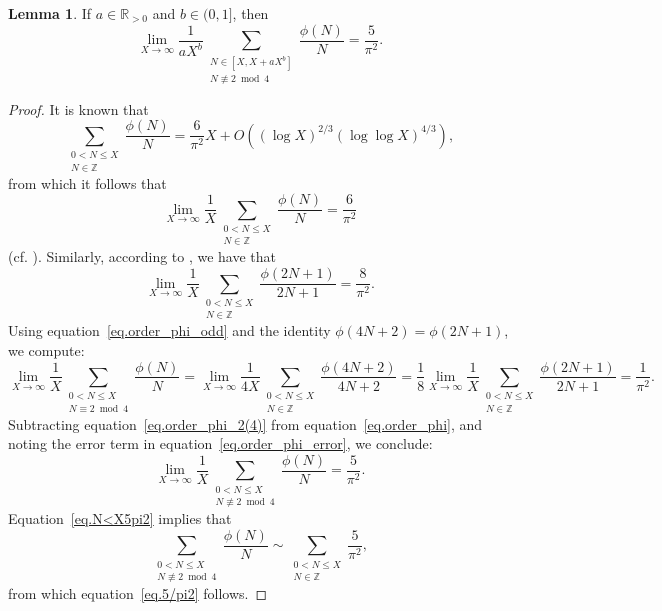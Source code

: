 \documentclass{amsart}
\theoremstyle{definition}
\newtheorem {lemma}[theorem]{Lemma}
\numberwithin{equation}{section}
\begin{document}
\begin{lemma}\label{lem.phi_order}
If $a\in\mathbb{R}_{> 0}$ and $b \in (0,1]$, then
\begin{equation}\label{eq.5/pi2}
\lim_{X \to \infty} \frac{1}{aX^b} \sum_{\substack{N \in [X, X + aX^b] \\ N \not\equiv 2\bmod 4}} \frac{\phi(N)}{N}  
=\frac{5}{\pi^2}.
\end{equation}
\end{lemma}
\begin{proof}
It is known that
\begin{equation}\label{eq.order_phi_error}
\sum_{\substack{0<N \leq X\\N\in\mathbb{Z}}} \frac{\phi(N)}{N} = \frac{6}{\pi^2}X+O((\log X)^{2/3}(\log \log X)^{4/3}), 
\end{equation}
from which it follows that
\begin{equation}\label{eq.order_phi}
\lim_{X \to \infty} \frac{1}{X}\sum_{\substack{0<N \leq X\\N\in\mathbb{Z}}} \frac{\phi(N)}{N} = \frac{6}{\pi^2} 
\end{equation}
(cf. \cite[equation~(1.74)]{IK}).
Similarly, according to \cite{N75}, we have that
\begin{equation}
    \lim_{X \to \infty} \frac{1}{X} \sum_{\substack{0< N \leq X \\ N \in \mathbb{Z}}}  \frac{\phi(2N+1)}{2N+1} = \frac{8}{\pi^2}.\label{eq.order_phi_odd}
\end{equation}
Using equation~\eqref{eq.order_phi_odd} and the identity $\phi(4N+2) = \phi(2N+1)$, we compute:
\begin{equation}
\lim_{X \to \infty} \frac{1}{X} \sum_{\substack{0<N \leq X \\ N \equiv 2\bmod 4}}\frac{\phi(N)}{N} 
= \lim_{X \to \infty} \frac{1}{4X} \sum_{\substack{0<N \leq X\\N\in\mathbb{Z}}} \frac{\phi(4N+2)}{4N+2} = \frac{1}{8} \lim_{X \to \infty} \frac{1}{X} \sum_{\substack{0<N \leq X\\N\in\mathbb{Z}}} \frac{\phi(2N+1)}{2N+1} = \frac{1}{\pi^2}. \label{eq.order_phi_2(4)}
\end{equation}
Subtracting equation~\eqref{eq.order_phi_2(4)} from equation~\eqref{eq.order_phi}, and noting the error term in equation~\eqref{eq.order_phi_error},  we conclude: 
\begin{equation}\label{eq.N<X5pi2}
\lim_{X \to \infty} \frac{1}{X} \sum_{\substack{0<N \leq X \\ N \not\equiv 2 \bmod 4}} \frac{\phi(N)}{N} 
=\frac{5}{\pi^2}.
\end{equation}
Equation~\eqref{eq.N<X5pi2} implies that 
\begin{equation}
    \sum_{\substack{0<N \leq X \\ N \not\equiv 2 \bmod 4}} \frac{\phi(N)}{N} \sim \sum_{\substack{0<N \leq X \\ N \in \mathbb{Z}}} \frac{5}{\pi^2},
\end{equation}
from which equation~\eqref{eq.5/pi2} follows.
\end{proof}
\end{document}
